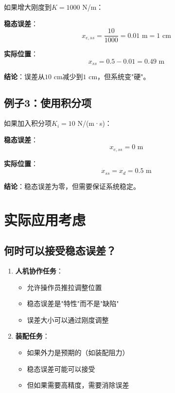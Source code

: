 \documentclass[12pt,a4paper]{article}
\begin{document}
如果增大刚度到$K = 1000$ N/m：

\textbf{稳态误差}：
\begin{equation}
x_{e,ss} = \frac{10}{1000} = 0.01 \text{ m} = 1 \text{ cm}
\end{equation}

\textbf{实际位置}：
\begin{equation}
x_{ss} = 0.5 - 0.01 = 0.49 \text{ m}
\end{equation}

\textbf{结论}：误差从$10$ cm减少到$1$ cm，但系统变"硬"。

\subsection{例子3：使用积分项}

如果加入积分项$K_i = 10$ N/(m·s)：

\textbf{稳态误差}：
\begin{equation}
x_{e,ss} = 0 \text{ m}
\end{equation}

\textbf{实际位置}：
\begin{equation}
x_{ss} = x_d = 0.5 \text{ m}
\end{equation}

\textbf{结论}：稳态误差为零，但需要保证系统稳定。

\section{实际应用考虑}

\subsection{何时可以接受稳态误差？}

\begin{enumerate}
\item \textbf{人机协作任务}：
\begin{itemize}
\item 允许操作员推拉调整位置
\item 稳态误差是"特性"而不是"缺陷"
\item 误差大小可以通过刚度调整
\end{itemize}

\item \textbf{装配任务}：
\begin{itemize}
\item 如果外力是预期的（如装配阻力）
\item 稳态误差可能可以接受
\item 但如果需要高精度，需要消除误差
\end{itemize}
\end{enumerate}
\end{document}
